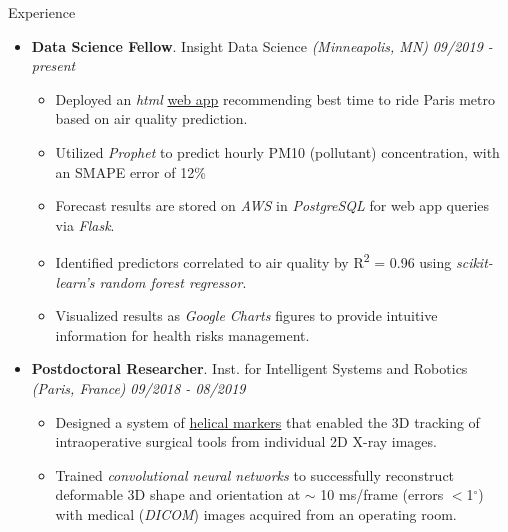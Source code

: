 \documentclass{resume} %
\begin{document}
	
	\begin{rSection}{Experience}
		
		\begin{itemize}[leftmargin=0em]
			\item {\bf Data Science Fellow}{. Insight Data Science \textit{(Minneapolis, MN)}} \hfill {\em 09/2019 - present}\\
			\vspace{-5mm}
			\begin{itemize}
				\setlength\itemsep{-1.75em}
				\item Deployed an \textit{html} \href{http://ParisMetro.xyz}{web app} recommending best time to ride Paris metro based on air quality prediction.\\
				\item Utilized \textit{Prophet} to predict hourly PM10 (pollutant) concentration, with an SMAPE error of 12\% \\
				\item Forecast results are stored on \textit{AWS} in \textit{PostgreSQL} for web app queries via \textit{Flask}.\\
				\item Identified predictors correlated to air quality by R\textsuperscript{2} = 0.96 using \textit{scikit-learn's random forest regressor}.\\
				\item Visualized results as \textit{Google Charts} figures to provide intuitive information for health risks management.
			\end{itemize}	
			
			\item {\bf Postdoctoral Researcher}{. Inst. for Intelligent Systems and Robotics \textit{(Paris, France)}} \hfill {\em 09/2018 - 08/2019}\\
			\vspace{-5mm}
			\begin{itemize}
				\setlength\itemsep{-1.75em}
				\item  Designed a system of \href{https://tinyurl.com/yxk4jou4}{helical markers} that enabled the 3D tracking of intraoperative surgical tools from individual 2D X-ray images.\\ 
				\item  Trained \textit{convolutional neural networks} to successfully reconstruct deformable 3D shape and orientation at $\sim$ 10 ms/frame (errors $<$1$^\circ$) with medical (\textit{DICOM}) images acquired from an operating room.
			\end{itemize}
			

\end{itemize}
\end{rSection}
\end{document}
